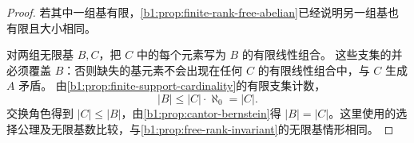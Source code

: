\begin{proof}
	若其中一组基有限，\cref{b1:prop:finite-rank-free-abelian}已经说明另一组基也有限且大小相同。

	对两组无限基 \(B,C\)，把 \(C\) 中的每个元素写为 \(B\) 的有限线性组合。 这些支集的并必须覆盖 \(B\)：否则缺失的基元素不会出现在任何 \(C\) 的有限线性组合中，与 \(C\) 生成 \(A\) 矛盾。 由\cref{b1:prop:finite-support-cardinality}的有限支集计数，
	\[
		|B|\le |C|\cdot\aleph_0=|C|.
	\]
	交换角色得到 \(|C|\le|B|\)，由\cref{b1:prop:cantor-bernstein}得 \(|B|=|C|\)。这里使用的选择公理及无限基数比较，与\cref{b1:prop:free-rank-invariant}的无限基情形相同。
\end{proof}
